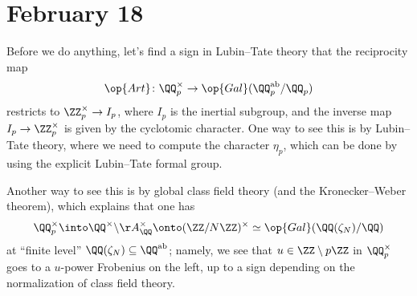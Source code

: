 \documentclass[../notes.tex]{subfiles}
\begin{document}
\section{February 18}

Before we do anything, let's find a sign in Lubin--Tate theory that the reciprocity map
\[\op{Art}\colon\QQ_p^\times\to\op{Gal}(\QQ_p^{\mathrm{ab}}/\QQ_p)\]
restricts to $\ZZ_p^\times\to I_p$, where $I_p$ is the inertial subgroup, and the inverse map $I_p\to\ZZ_p^\times$ is given by the cyclotomic character. One way to see this is by Lubin--Tate theory, where we need to compute the character $\eta_p$, which can be done by using the explicit Lubin--Tate formal group.

Another way to see this is by global class field theory (and the Kronecker--Weber theorem), which explains that one has
\[\QQ_p^\times\into\QQ^\times\backslash\AA_\QQ^\times\onto(\ZZ/N\ZZ)^\times\simeq\op{Gal}(\QQ(\zeta_N)/\QQ)\]
at ``finite level'' $\QQ(\zeta_N)\subseteq\QQ^{\mathrm{ab}}$; namely, we see that $u\in\ZZ\setminus p\ZZ$ in $\QQ_p^\times$ goes to a $u$-power Frobenius on the left, up to a sign depending on the normalization of class field theory.
\end{document}
